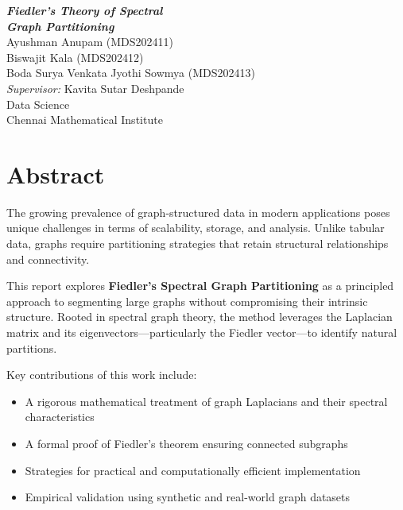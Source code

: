 \documentclass[hidelinks,12pt]{article}
\begin{document}
\vspace*{3cm}

\begin{center}
{\fontsize{22pt}{26pt}\selectfont \textbf{\textit{Fiedler’s Theory of Spectral}}\\[0.2cm]
\textbf{\textit{Graph Partitioning}}} \\[2cm]

{\Large 
    Ayushman Anupam (MDS202411)\\
    Biswajit Kala (MDS202412)\\
    Boda Surya Venkata Jyothi Sowmya (MDS202413)
} \\[1cm]

{\large 
    \emph{Supervisor:} Kavita Sutar Deshpande
} \\[1cm]

\Large Data Science \\
Chennai Mathematical Institute \\[2cm]
\end{center}

\newpage
\tableofcontents
\newpage

\section{Abstract}
\noindent
The growing prevalence of graph-structured data in modern applications poses unique challenges in terms of scalability, storage, and analysis. Unlike tabular data, graphs require partitioning strategies that retain structural relationships and connectivity.

\vspace{1em}
\noindent
This report explores \textbf{Fiedler’s Spectral Graph Partitioning} as a principled approach to segmenting large graphs without compromising their intrinsic structure. Rooted in spectral graph theory, the method leverages the Laplacian matrix and its eigenvectors—particularly the Fiedler vector—to identify natural partitions.

\vspace{1em}
\noindent
Key contributions of this work include:
\begin{itemize}
    \item A rigorous mathematical treatment of graph Laplacians and their spectral characteristics
    \item A formal proof of Fiedler’s theorem ensuring connected subgraphs
    \item Strategies for practical and computationally efficient implementation
    \item Empirical validation using synthetic and real-world graph datasets
\end{itemize}
\end{document}
